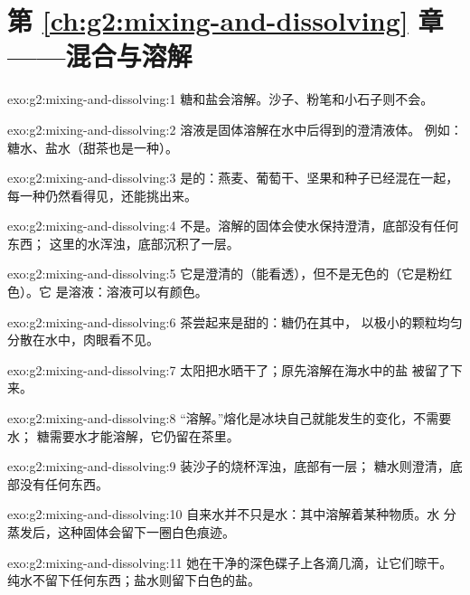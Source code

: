\section*{第 \ref{ch:g2:mixing-and-dissolving} 章——混合与溶解}

\begin{solution}{exo:g2:mixing-and-dissolving:1}
糖和盐会溶解。沙子、粉笔和小石子则不会。
\end{solution}

\begin{solution}{exo:g2:mixing-and-dissolving:2}
溶液是固体溶解在水中后得到的澄清液体。
例如：糖水、盐水（甜茶也是一种）。
\end{solution}

\begin{solution}{exo:g2:mixing-and-dissolving:3}
是的：燕麦、葡萄干、坚果和种子已经混在一起，
每一种仍然看得见，还能挑出来。
\end{solution}

\begin{solution}{exo:g2:mixing-and-dissolving:4}
不是。溶解的固体会使水保持澄清，底部没有任何东西；
这里的水浑浊，底部沉积了一层。
\end{solution}

\begin{solution}{exo:g2:mixing-and-dissolving:5}
它是澄清的（能看透），但不是无色的（它是粉红色）。它
是溶液：溶液可以有颜色。
\end{solution}

\begin{solution}{exo:g2:mixing-and-dissolving:6}
茶尝起来是甜的：糖仍在其中，
以极小的颗粒均匀分散在水中，肉眼看不见。
\end{solution}

\begin{solution}{exo:g2:mixing-and-dissolving:7}
太阳把水晒干了；原先溶解在海水中的盐
被留了下来。
\end{solution}

\begin{solution}{exo:g2:mixing-and-dissolving:8}
“溶解。”熔化是冰块自己就能发生的变化，不需要水；
糖需要水才能溶解，它仍留在茶里。
\end{solution}

\begin{solution}{exo:g2:mixing-and-dissolving:9}
装沙子的烧杯浑浊，底部有一层；
糖水则澄清，底部没有任何东西。
\end{solution}

\begin{solution}{exo:g2:mixing-and-dissolving:10}
自来水并不只是水：其中溶解着某种物质。水
分蒸发后，这种固体会留下一圈白色痕迹。
\end{solution}

\begin{solution}{exo:g2:mixing-and-dissolving:11}
她在干净的深色碟子上各滴几滴，让它们晾干。
纯水不留下任何东西；盐水则留下白色的盐。
\end{solution}
